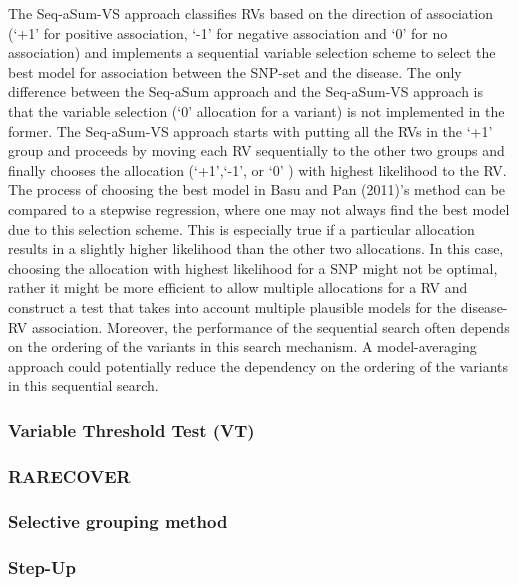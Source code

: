 \documentclass[]{book}
\theoremstyle{definition}
\theoremstyle{definition}
\theoremstyle{definition}
\theoremstyle{remark}
\begin{document}
The Seq-aSum-VS approach classiﬁes RVs based on the direction of
association (`+1' for positive association, `-1' for negative
association and `0' for no association) and implements a sequential
variable selection scheme to select the best model for association
between the SNP-set and the disease. The only diﬀerence between the
Seq-aSum approach and the Seq-aSum-VS approach is that the variable
selection (`0' allocation for a variant) is not implemented in the
former. The Seq-aSum-VS approach starts with putting all the RVs in the
`+1' group and proceeds by moving each RV sequentially to the other two
groups and ﬁnally chooses the allocation (`+1',`-1', or `0' ) with
highest likelihood to the RV. The process of choosing the best model in
Basu and Pan (2011)'s method can be compared to a stepwise regression,
where one may not always ﬁnd the best model due to this selection
scheme. This is especially true if a particular allocation results in a
slightly higher likelihood than the other two allocations. In this case,
choosing the allocation with highest likelihood for a SNP might not be
optimal, rather it might be more eﬃcient to allow multiple allocations
for a RV and construct a test that takes into account multiple plausible
models for the disease-RV association. Moreover, the performance of the
sequential search often depends on the ordering of the variants in this
search mechanism. A model-averaging approach could potentially reduce
the dependency on the ordering of the variants in this sequential
search.

\subsubsection{Variable Threshold Test
(VT)}\label{variable-threshold-test-vt}

\subsubsection{RARECOVER}\label{rarecover}

\subsubsection{Selective grouping
method}\label{selective-grouping-method}

\subsubsection{Step-Up}\label{step-up}
\end{document}
